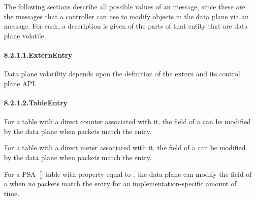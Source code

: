 \documentclass[11pt]{article}
\begin{document}
{%
The following sections describe all possible values of an 
message, since these are the messages that a controller can use to
modify objects in the data plane via an  message.  For each, a
description is given of the parts of that entity that are data plane
volatile.%

\paragraph{8.2.1.1.\hspace*{0.5em}ExternEntry}\label{sec-externentry}%

\noindent{}Data plane volatility depends upon the definition of the extern and
its control plane API.%

\paragraph{8.2.1.2.\hspace*{0.5em}TableEntry}\label{sec-tableentry}%

\noindent{}For a table with a direct counter associated with it, the 
field of a  can be modified by the data plane when packets
match the entry.%

For a table with a direct meter associated with it, the
 field of a  can be modified by the data
plane when packets match the entry.%

For a PSA~[] table with property  equal to
, the data plane can modify the
 field of a  when \emph{no} packets match the entry
for an implementation-specific amount of time.%

}
\end{document}
